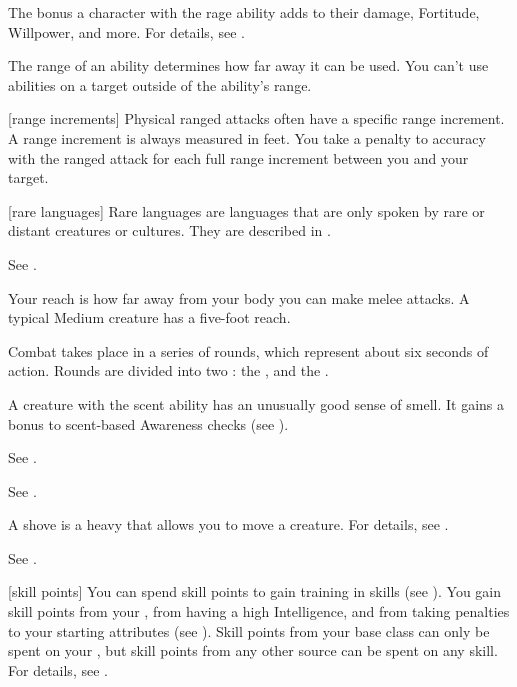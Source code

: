  The bonus a character with the rage ability adds to their damage, Fortitude, Willpower, and more.
For details, see .

 The range of an ability determines how far away it can be used.
You can't use abilities on a target outside of the ability's range.

[range increments] Physical ranged attacks often have a specific range increment.
A range increment is always measured in feet.
You take a  penalty to accuracy with the ranged attack for each full range increment between you and your target.

[rare languages] Rare languages are languages that are only spoken by rare or distant creatures or cultures.
They are described in .

 See .

 Your reach is how far away from your body you can make melee attacks.
A typical Medium creature has a five-foot reach.

 Combat takes place in a series of rounds, which represent about six seconds of action.
Rounds are divided into two : the , and the .

 A creature with the scent ability has an unusually good sense of smell.
It gains a  bonus to scent-based Awareness checks (see ).

 See .

 See .

 A shove is a heavy  that allows you to move a creature.
For details, see .

 See .

[skill points] You can spend skill points to gain training in skills (see ).
You gain skill points from your , from having a high Intelligence, and from taking penalties to your starting attributes (see ).
Skill points from your base class can only be spent on your , but skill points from any other source can be spent on any skill.
For details, see .

